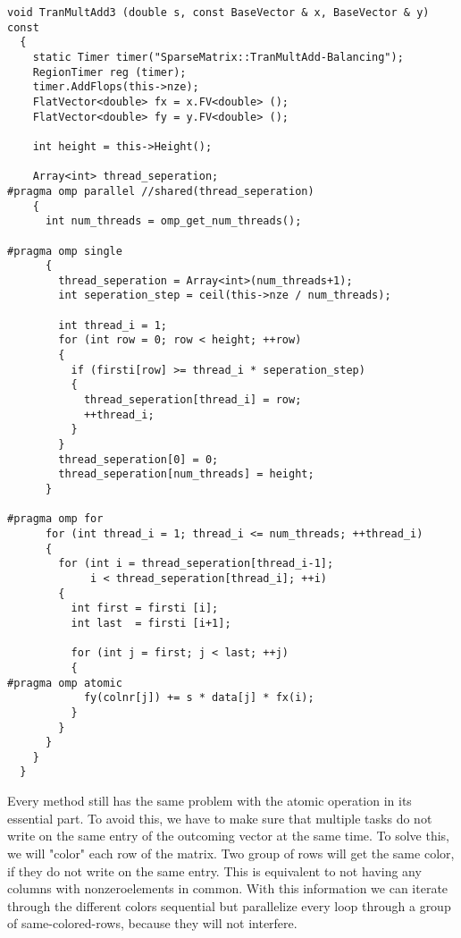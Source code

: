 \documentclass[a4paper,11pt]{scrartcl}
\begin{document}
\begin{lstlisting}
void TranMultAdd3 (double s, const BaseVector & x, BaseVector & y) const
  {
    static Timer timer("SparseMatrix::TranMultAdd-Balancing");
    RegionTimer reg (timer);
    timer.AddFlops(this->nze);
    FlatVector<double> fx = x.FV<double> ();
    FlatVector<double> fy = y.FV<double> ();

    int height = this->Height();

    Array<int> thread_seperation;
#pragma omp parallel //shared(thread_seperation)
    {
      int num_threads = omp_get_num_threads();

#pragma omp single
      {
        thread_seperation = Array<int>(num_threads+1);
        int seperation_step = ceil(this->nze / num_threads);

        int thread_i = 1;
        for (int row = 0; row < height; ++row)
        {
          if (firsti[row] >= thread_i * seperation_step)
          {
            thread_seperation[thread_i] = row;
            ++thread_i;
          }
        }
        thread_seperation[0] = 0;
        thread_seperation[num_threads] = height;
      }

#pragma omp for
      for (int thread_i = 1; thread_i <= num_threads; ++thread_i)
      {
        for (int i = thread_seperation[thread_i-1];
             i < thread_seperation[thread_i]; ++i)
        {
          int first = firsti [i];
          int last  = firsti [i+1];

          for (int j = first; j < last; ++j)
          {
#pragma omp atomic
            fy(colnr[j]) += s * data[j] * fx(i);
          }
        }
      }
    }
  }

\end{lstlisting}

Every method still has the same problem with the atomic operation in its
essential part. To avoid this, we have to make sure that multiple tasks do not
write on the same entry of the outcoming vector at the same time. To solve this,
 we will "color" each row of the matrix. Two group of rows will get the same 
color, if they do not write on the same entry. This is equivalent to not having
any columns with nonzeroelements in common. With this information we can iterate through the different colors sequential but parallelize every loop through
 a group of same-colored-rows, because they will not interfere.
\end{document}
